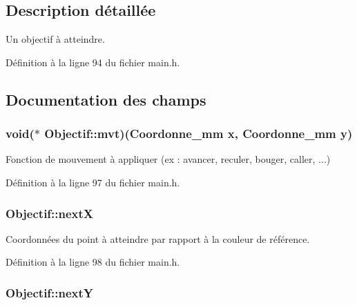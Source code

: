 \subsection{Description détaillée}
Un objectif à atteindre. 

Définition à la ligne 94 du fichier main.\+h.



\subsection{Documentation des champs}
\hypertarget{struct_objectif_abcc900b2a2f79b8ba4e543540e48378b}{
\subsubsection[{mvt}]{\setlength{\rightskip}{0pt plus 5cm}void($\ast$ Objectif\+::mvt)({\bf Coordonne\+\_\+mm} x, {\bf Coordonne\+\_\+mm} y)}}\label{struct_objectif_abcc900b2a2f79b8ba4e543540e48378b}


Fonction de mouvement à appliquer (ex \+: avancer, reculer, bouger, caller, ...) 



Définition à la ligne 97 du fichier main.\+h.

\hypertarget{struct_objectif_a5f29b0da361761fa2fa8536d5dca2107}{
\subsubsection[{next\+X}]{ Objectif\+::next\+X}}\label{struct_objectif_a5f29b0da361761fa2fa8536d5dca2107}


Coordonnées du point à atteindre par rapport à la couleur de référence. 



Définition à la ligne 98 du fichier main.\+h.

\hypertarget{struct_objectif_ae9d876c940417db8594ad8edc03b2aa6}{
\subsubsection[{next\+Y}]{ Objectif\+::next\+Y}}\label{struct_objectif_ae9d876c940417db8594ad8edc03b2aa6}


